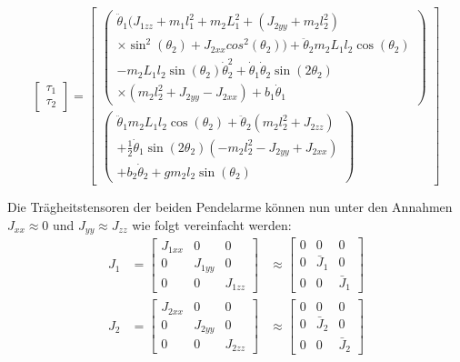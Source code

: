 \begin{equation}
\label{eqn.TauComplex}
\begin{bmatrix}
\tau_1 \\
\tau_2
\end{bmatrix}
=
\begin{bmatrix}
\begin{pmatrix}
\ddot{\theta}_1(J_{1zz}+m_1l^2_1+m_2L^2_1+(J_{2yy}+m_2l^2_2) 						\\
\times \sin^2(\theta_2)+J_{2xx}cos^2(\theta_2))+\ddot{\theta}_2m_2L_1l_2\cos(\theta_2)			\\
-m_2L_1l_2\sin(\theta_2)\dot{\theta}^2_2+\dot{\theta}_1\dot{\theta}_2\sin(2\theta_2)	\\
\times(m_2l^2_2+J_{2yy}-J_{2xx})+b_1\dot{\theta}_1
\end{pmatrix}
\\
\begin{pmatrix}
\ddot{\theta}_1m_2L_1l_2\cos(\theta_2)+\ddot{\theta}_2(m_2l^2_2+J_{2zz})	\\
+\frac{1}{2}\dot{\theta}_1\sin(2\theta_2)(-m_2l^2_2-J_{2yy}+J_{2xx})						\\
+b_2\dot{\theta}_2+gm_2l_2\sin(\theta_2)
\end{pmatrix}
\end{bmatrix}
\end{equation}

Die Trägheitstensoren der beiden Pendelarme können nun unter den Annahmen $J_{xx} \approx 0$ und $J_{yy} \approx J_{zz}$ wie folgt vereinfacht werden: 
\begin{align}
\label{eqn.Tragheitstensoren}
J_1&=
\begin{bmatrix}
J_{1xx} & 0 & 0\\
0 & J_{1yy} & 0\\
0 & 0 & J_{1zz}
\end{bmatrix}
&\approx
\begin{bmatrix}
0 & 0 & 0\\
0 & \bar{J}_{1} & 0\\
0 & 0 & \bar{J}_{1}
\end{bmatrix}
\nonumber \\
J_2&=
\begin{bmatrix}
J_{2xx} & 0 & 0\\
0 & J_{2yy} & 0\\
0 & 0 & J_{2zz}
\end{bmatrix}
&\approx
\begin{bmatrix}
0 & 0 & 0\\
0 & \bar{J}_{2} & 0\\
0 & 0 & \bar{J}_{2}
\end{bmatrix}
\end{align}

